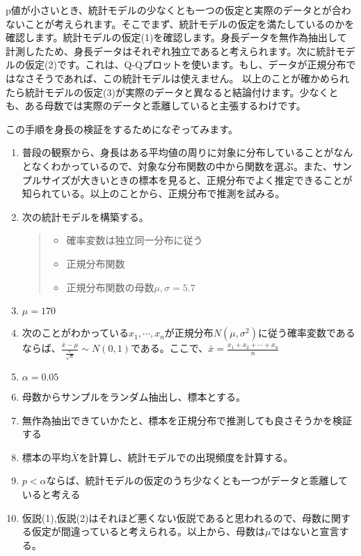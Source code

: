 p値が小さいとき、統計モデルの少なくとも一つの仮定と実際のデータとが合わないことが考えられます。そこでまず、統計モデルの仮定を満たしているのかを確認します。統計モデルの仮定(1)を確認します。身長データを無作為抽出して計測したため、身長データはそれぞれ独立であると考えられます。次に統計モデルの仮定(2)です。これは、Q-Qプロットを使います。もし、データが正規分布ではなさそうであれば、この統計モデルは使えません。
以上のことが確かめられたら統計モデルの仮定(3)が実際のデータと異なると結論付けます。少なくとも、ある母数では実際のデータと乖離していると主張するわけです。
\fi




この手順を身長の検証をするためになぞってみます。
\begin{enumerate}
    \item 普段の観察から、身長はある平均値の周りに対象に分布していることがなんとなくわかっているので、対象な分布関数の中から関数を選ぶ。また、サンプルサイズが大きいときの標本を見ると、正規分布でよく推定できることが知られている。以上のことから、正規分布で推測を試みる。
    \item 次の統計モデルを構築する。
    \begin{quote}
        \begin{itemize}
            \item 確率変数は独立同一分布に従う
            \item 正規分布関数
            \item 正規分布関数の母数$\mu,\sigma=5.7$
        \end{itemize}
    \end{quote}
    \item $\mu=170$
    \item 次のことがわかっている$x_1,\cdots,x_n$が正規分布$N(\mu,\sigma^2)$に従う確率変数であるならば、$\frac{\bar{x}-\mu}{\frac{\sigma}{\sqrt{n}}}\sim N(0,1)$である。ここで、$\bar{x}=\frac{x_1+x_2+\cdots+x_n}{n}$
    \item $\alpha=0.05$
    \item 母数からサンプルをランダム抽出し、標本とする。
    \item 無作為抽出できていかたと、標本を正規分布で推測しても良さそうかを検証する
    \item 標本の平均$\bar{X}$を計算し、統計モデルでの出現頻度を計算する。
    \item $p<\alpha$ならば、統計モデルの仮定のうち少なくとも一つがデータと乖離していると考える
    \item 仮説(1),仮説(2)はそれほど悪くない仮説であると思われるので、母数に関する仮定が間違っていると考えられる。以上から、母数は$\mu$ではないと宣言する。
\end{enumerate}

